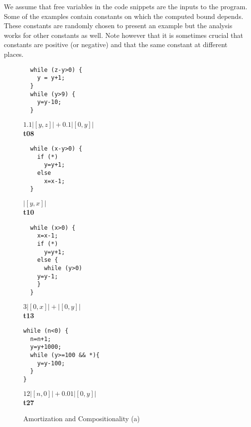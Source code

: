 \documentclass[nocopyrightspace,preprint]{sigplanconf}
\begin{document}
We assume that free variables in the code snippets are the inputs to
the program. Some of the examples contain constants on which the
computed bound depends.  These constants are randomly chosen to
present an example but the analysis works for other constants as well.
Note however that it is sometimes crucial that constants are positive
(or negative) and that the same constant at different places.


\begin{figure*}[t!]
\setlength{\progwidth}{.24\linewidth}
  \centering

  \begin{minipage}[b]{\progwidth}
    \begin{center}
   \begin{lstlisting}
  while (z-y>0) {
    y = y+1;
  }
  while (y>9) {
    y=y-10;
  }
   \end{lstlisting}

$1.1|[y,z]| + 0.1|[0,y]|$
\\[.7\baselineskip] 
      {\bf t08}
    \end{center}
  \end{minipage}
%
%
%
  \begin{minipage}[b]{\progwidth}
    \begin{center}
   \begin{lstlisting}
  while (x-y>0) {
    if (*)
      y=y+1;
    else
      x=x-1;
  }
   \end{lstlisting}

$|[y,x]|$
\\[.7\baselineskip]
      {\bf t10}
    \end{center}
  \end{minipage}
%
%
%
  \begin{minipage}[b]{\progwidth}
    \begin{center}
   \begin{lstlisting}
  while (x>0) {
    x=x-1;
    if (*) 
      y=y+1;
    else {
      while (y>0)
	y=y-1;
    }
  }
   \end{lstlisting}

$3|[0,x]| + |[0,y]|$
\\[.7\baselineskip]
      {\bf t13}
    \end{center}
  \end{minipage}
%
%
%
  \begin{minipage}[b]{\progwidth}
    \begin{center}
   \begin{lstlisting}
while (n<0) {
  n=n+1;
  y=y+1000;
  while (y>=100 && *){
    y=y-100;
  }
}
   \end{lstlisting}

$12|[n,0]| + 0.01|[0,y]|$
\\[.7\baselineskip]
      {\bf t27}
    \end{center}
  \end{minipage}
   \caption{Amortization and Compositionality (a)}
  \label{fig:cat1a}
\end{figure*}
\end{document}
